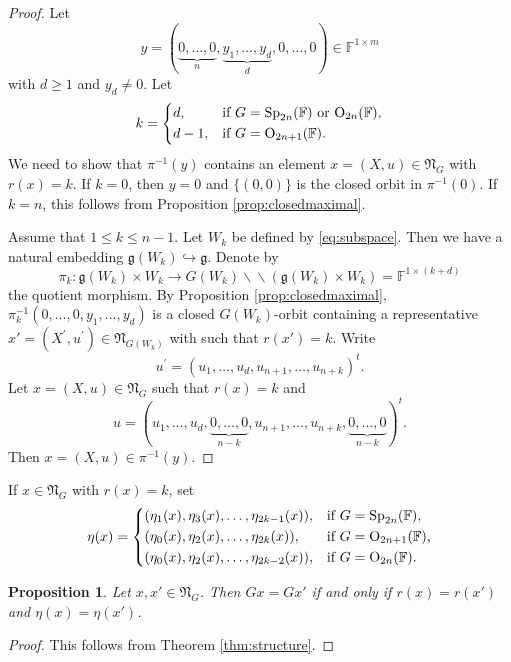 \documentclass[12pt]{amsart}
\newtheorem{prop}[lm]{Proposition}
\theoremstyle{definition}
\theoremstyle{remark}\newtheorem{rmk}[lm]{Remark}
\newcommand{\RO}{{\mathrm {O}}}
\newcommand{\Sp}{{\mathrm{Sp}}}
\newcommand{\g}{\mathfrak g}
\newcommand{\fN}{\mathfrak N}
\newcommand{\C}{\mathbb{F}}
\newcommand{\bac}{\backslash\!\!\backslash}
\begin{document}
	\begin{proof}
		Let
		\begin{equation*}
			y=(\underbrace{0,\dots,0}_n,\underbrace{y_1,\dots,y_d}_d,0,\dots,0)\in\C^{1\times m}
		\end{equation*}
		with $d\geq 1$ and $y_d\neq 0$. Let
		\begin{equation*}
			k=\begin{cases*}
				d,&if $G=\Sp_{2n}(\C)$ or $\RO_{2n}(\C)$,\\
				d-1,&if $G=\RO_{2n+1}(\C)$.
			\end{cases*}
		\end{equation*}
		We need to show that $\pi^{-1}(y)$ contains an element $x=(X,u)\in\fN_G$ with $r(x)=k$. If $k=0$, then $y=0$ and $\{(0,0)\}$ is the closed orbit in $\pi^{-1}(0)$. If $k=n$, this follows from Proposition \ref{prop:closedmaximal}.
		
		Assume that $1\leq k\leq n-1$. Let $W_k$ be defined by \eqref{eq:subspace}. Then we have a natural embedding $\g(W_k)\hookrightarrow\g$. Denote by
		\begin{equation*}
			\pi_k:\g(W_k)\times W_k\to G(W_k)\bac(\g(W_k)\times W_k)=\C^{1\times (k+d)}
		\end{equation*}
		the quotient morphism. By Proposition \ref{prop:closedmaximal}, $\pi_k^{-1}(0,\dots,0,y_1,\dots,y_d)$ is a closed $G(W_k)$-orbit containing a representative $x'=(X^{\prime},u^{\prime})\in\fN_{G(W_k)}$ with such that $r(x')=k$. Write
		\begin{equation*}
			u^{\prime}=(u_1,\dots,u_d,u_{n+1},\dots,u_{n+k})^t.
		\end{equation*}
		Let $x=(X,u)\in\fN_G$ such that $r(x)=k$ and
		\begin{equation*}
			u=(u_1,\dots,u_d,\underbrace{0,\dots,0}_{n-k},u_{n+1},\dots,u_{n+k},\underbrace{0,\dots,0}_{n-k})^t.
		\end{equation*}
		Then $x=(X,u)\in\pi^{-1}(y)$.
	\end{proof}
    If $x\in\fN_{G}$ with $r(x)=k$, set
    \begin{equation}
    	\label{eq:invariant}
        \eta(x)=\begin{cases*}
        	(\eta_1(x),\eta_3(x),\dots,\eta_{2k-1}(x)),&if $G=\Sp_{2n}(\C)$,\\
        	(\eta_0(x),\eta_2(x),\dots,\eta_{2k}(x)),&if $G=\RO_{2n+1}(\C)$,\\
        	(\eta_0(x),\eta_2(x),\dots,\eta_{2k-2}(x)),&if $G=\RO_{2n}(\C)$.
        \end{cases*}
    \end{equation}
    \begin{prop}
        \label{prop:closeddifferent}
        Let $x,x'\in\fN_{G}$. Then $Gx=Gx'$ if and only if $r(x)=r(x')$ and $\eta(x)=\eta(x')$.
    \end{prop}
    \begin{proof}
        This follows from Theorem \ref{thm:structure}.
    \end{proof}
    
\end{document}
